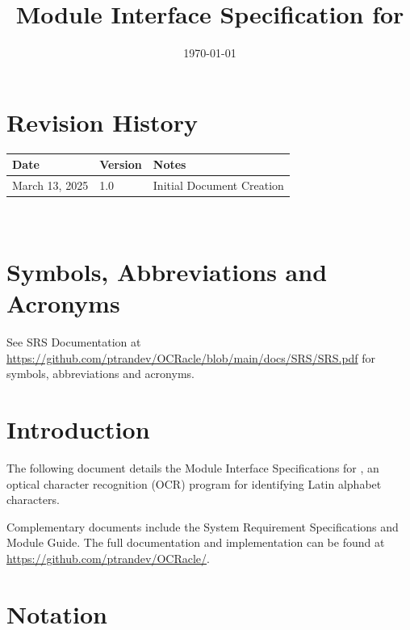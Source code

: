 \documentclass[12pt, titlepage]{article}
\begin{document}
\title{Module Interface Specification for \progname{}}

\author{\authname}

\date{\today}

\maketitle


\section{Revision History}

\begin{tabularx}{\textwidth}{p{3cm}p{2cm}X}
\toprule {\bf Date} & {\bf Version} & {\bf Notes}\\
\midrule
March 13, 2025 & 1.0 & Initial Document Creation\\
\bottomrule
\end{tabularx}

~\newpage

\section{Symbols, Abbreviations and Acronyms}

See SRS Documentation at \url{https://github.com/ptrandev/OCRacle/blob/main/docs/SRS/SRS.pdf}
for symbols, abbreviations and acronyms.

\newpage

\tableofcontents

\newpage


\section{Introduction}

The following document details the Module Interface Specifications for
\progname{}, an optical character recognition (OCR) program for identifying
Latin alphabet characters.

Complementary documents include the System Requirement Specifications
and Module Guide.  The full documentation and implementation can be
found at \url{https://github.com/ptrandev/OCRacle/}.

\section{Notation}
\end{document}
